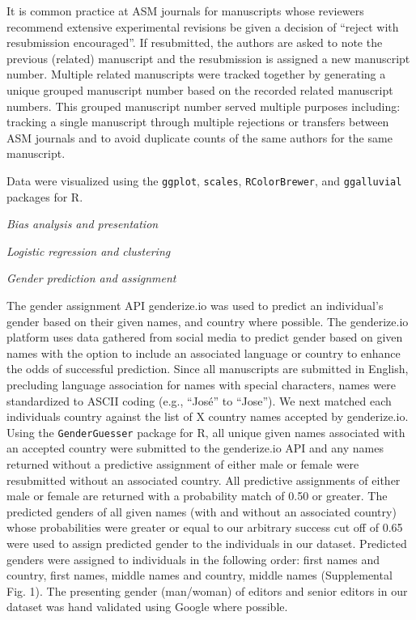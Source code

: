 \documentclass[11pt,]{article}
\begin{document}
It is common practice at ASM journals for manuscripts whose reviewers
recommend extensive experimental revisions be given a decision of
``reject with resubmission encouraged''. If resubmitted, the authors are
asked to note the previous (related) manuscript and the resubmission is
assigned a new manuscript number. Multiple related manuscripts were
tracked together by generating a unique grouped manuscript number based
on the recorded related manuscript numbers. This grouped manuscript
number served multiple purposes including: tracking a single manuscript
through multiple rejections or transfers between ASM journals and to
avoid duplicate counts of the same authors for the same manuscript.

Data were visualized using the \texttt{ggplot}, \texttt{scales},
\texttt{RColorBrewer}, and \texttt{ggalluvial} packages for R.

\emph{Bias analysis and presentation}

\emph{Logistic regression and clustering}

\emph{Gender prediction and assignment}

The gender assignment API genderize.io was used to predict an
individual's gender based on their given names, and country where
possible. The genderize.io platform uses data gathered from social media
to predict gender based on given names with the option to include an
associated language or country to enhance the odds of successful
prediction. Since all manuscripts are submitted in English, precluding
language association for names with special characters, names were
standardized to ASCII coding (e.g., ``José'' to ``Jose''). We next
matched each individuals country against the list of X country names
accepted by genderize.io. Using the \texttt{GenderGuesser} package for
R, all unique given names associated with an accepted country were
submitted to the genderize.io API and any names returned without a
predictive assignment of either male or female were resubmitted without
an associated country. All predictive assignments of either male or
female are returned with a probability match of 0.50 or greater. The
predicted genders of all given names (with and without an associated
country) whose probabilities were greater or equal to our arbitrary
success cut off of 0.65 were used to assign predicted gender to the
individuals in our dataset. Predicted genders were assigned to
individuals in the following order: first names and country, first
names, middle names and country, middle names (Supplemental Fig. 1). The
presenting gender (man/woman) of editors and senior editors in our
dataset was hand validated using Google where possible.
\end{document}
